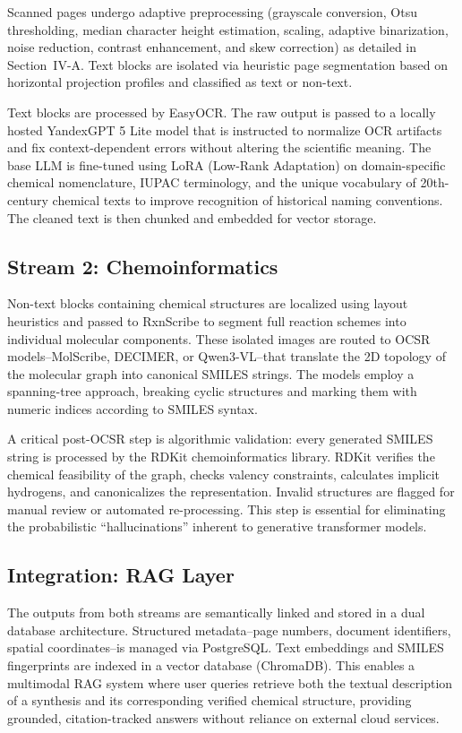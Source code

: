 \documentclass[conference]{IEEEtran}
\begin{document}
Scanned pages undergo adaptive preprocessing (grayscale conversion, Otsu thresholding, median character height estimation, scaling, adaptive binarization, noise reduction, contrast enhancement, and skew correction) as detailed in Section~IV-A. Text blocks are isolated via heuristic page segmentation based on horizontal projection profiles and classified as text or non-text.

Text blocks are processed by EasyOCR. The raw output is passed to a locally hosted YandexGPT 5 Lite model that is instructed to normalize OCR artifacts and fix context-dependent errors without altering the scientific meaning. The base LLM is fine-tuned using LoRA (Low-Rank Adaptation) on domain-specific chemical nomenclature, IUPAC terminology, and the unique vocabulary of 20th-century chemical texts to improve recognition of historical naming conventions. The cleaned text is then chunked and embedded for vector storage.

\subsection{Stream 2: Chemoinformatics}

Non-text blocks containing chemical structures are localized using layout heuristics and passed to RxnScribe to segment full reaction schemes into individual molecular components. These isolated images are routed to OCSR models--MolScribe, DECIMER, or Qwen3-VL--that translate the 2D topology of the molecular graph into canonical SMILES strings. The models employ a spanning-tree approach, breaking cyclic structures and marking them with numeric indices according to SMILES syntax.

A critical post-OCSR step is algorithmic validation: every generated SMILES string is processed by the RDKit chemoinformatics library. RDKit verifies the chemical feasibility of the graph, checks valency constraints, calculates implicit hydrogens, and canonicalizes the representation. Invalid structures are flagged for manual review or automated re-processing. This step is essential for eliminating the probabilistic ``hallucinations'' inherent to generative transformer models.

\subsection{Integration: RAG Layer}

The outputs from both streams are semantically linked and stored in a dual database architecture. Structured metadata--page numbers, document identifiers, spatial coordinates--is managed via PostgreSQL. Text embeddings and SMILES fingerprints are indexed in a vector database (ChromaDB). This enables a multimodal RAG system where user queries retrieve both the textual description of a synthesis and its corresponding verified chemical structure, providing grounded, citation-tracked answers without reliance on external cloud services.
\end{document}
